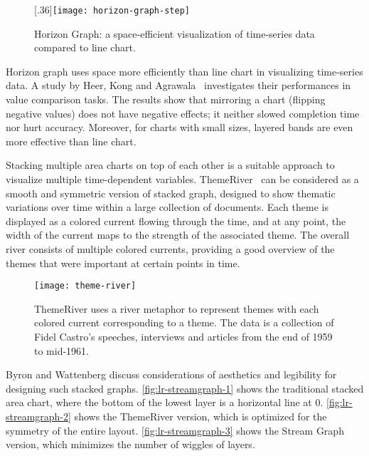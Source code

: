 \begin{figure}[!htb]
\centering
{}[.36\columnwidth]{\texttt{[image: horizon-graph-step]}}
\hfill
{}
\caption{Horizon Graph: a space-efficient visualization of time-series data compared to line chart. }
\label{fig:lr-horizon-graph}
\end{figure}

Horizon graph uses space more efficiently than line chart in visualizing time-series data. A study by Heer, Kong and Agrawala~\cite{Heer2009a} investigates their performances in value comparison tasks. The results show that mirroring a chart (flipping negative values) does not have negative effects; it neither slowed completion time nor hurt accuracy. Moreover, for charts with small sizes, layered bands are even more effective than line chart.

Stacking multiple area charts on top of each other is a suitable approach to visualize multiple time-dependent variables. ThemeRiver~\cite{Havre2002} can be considered as a smooth and symmetric version of stacked graph, designed to show thematic variations over time within a large collection of documents. Each theme is displayed as a colored current flowing through the time, and at any point, the width of the current maps to the strength of the associated theme. The overall river consists of multiple colored currents, providing a good overview of the themes that were important at certain points in time. 

\begin{figure}[!htb]
	\centering
	\texttt{[image: theme-river]}
	\caption{ThemeRiver uses a river metaphor to represent themes with each colored current corresponding to a theme. The data is a collection of Fidel Castro's speeches, interviews and articles from the end of 1959 to mid-1961. }
	\label{fig:lr-theme-river}
\end{figure}

Byron and Wattenberg discuss considerations of aesthetics and legibility for designing such stacked graphs. \autoref{fig:lr-streamgraph-1} shows the traditional stacked area chart, where the bottom of the lowest layer is a horizontal line at 0. \autoref{fig:lr-streamgraph-2} shows the ThemeRiver version, which is optimized for the symmetry of the entire layout. \autoref{fig:lr-streamgraph-3} shows the Stream Graph~\cite{Byron2008} version, which minimizes the number of wiggles of layers.


